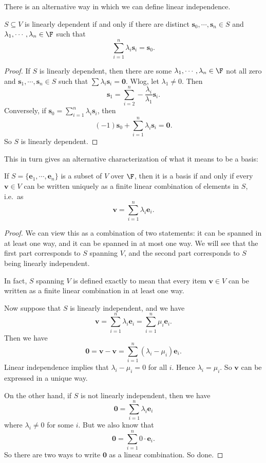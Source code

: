 \documentclass[a4paper]{article}
\begin{document}
There is an alternative way in which we can define linear independence.
\begin{lemma}
  $S\subseteq V$ is linearly dependent if and only if there are distinct $\mathbf{s}_0, \cdots, \mathbf{s}_n \in S$ and $\lambda_1, \cdots, \lambda_n\in \F$ such that
  \[
    \sum_{i = 1}^n \lambda_i \mathbf{s}_i = \mathbf{s}_0.
  \]
\end{lemma}

\begin{proof}
  If $S$ is linearly dependent, then there are some $\lambda_1, \cdots, \lambda_n \in \F$ not all zero and $\mathbf{s}_1,\cdots, \mathbf{s}_n \in S$ such that $\sum \lambda_i \mathbf{s}_i = \mathbf{0}$. Wlog, let $\lambda_1\not= 0$. Then
  \[
    \mathbf{s}_1 = \sum_{i = 2}^n -\frac{\lambda_i}{\lambda_1} \mathbf{s}_i.
  \]
  Conversely, if $\mathbf{s}_0 = \sum_{i = 1}^n \lambda_i \mathbf{s}_i$, then
  \[
    (-1)\mathbf{s}_0 + \sum_{i = 1}^n \lambda_i \mathbf{s}_i = \mathbf{0}.
  \]
  So $S$ is linearly dependent.
\end{proof}

This in turn gives an alternative characterization of what it means to be a basis:
\begin{prop}
  If $S = \{\mathbf{e}_1, \cdots, \mathbf{e}_n\}$ is a subset of $V$ over $\F$, then it is a basis if and only if every $\mathbf{v}\in V$ can be written uniquely as a finite linear combination of elements in $S$, i.e.\ as
  \[
    \mathbf{v} = \sum_{i = 1}^n \lambda_i \mathbf{e}_i.
  \]
\end{prop}

\begin{proof}
  We can view this as a combination of two statements: it can be spanned in at least one way, and it can be spanned in at most one way. We will see that the first part corresponds to $S$ spanning $V$, and the second part corresponds to $S$ being linearly independent.

  In fact, $S$ spanning $V$ is defined exactly to mean that every item $\mathbf{v}\in V$ can be written as a finite linear combination in at least one way.

  Now suppose that $S$ is linearly independent, and we have
  \[
    \mathbf{v} = \sum_{i = 1}^n \lambda_i \mathbf{e}_i = \sum_{i = 1}^n\mu_i \mathbf{e}_i.
  \]
  Then we have
  \[
    \mathbf{0} = \mathbf{v} - \mathbf{v} = \sum_{i = 1}^n (\lambda_i - \mu_i) \mathbf{e}_i.
  \]
  Linear independence implies that $\lambda_i - \mu_i = 0$ for all $i$. Hence $\lambda_i = \mu_i$. So $\mathbf{v}$ can be expressed in a unique way.

  On the other hand, if $S$ is not linearly independent, then we have
  \[
    \mathbf{0} = \sum_{i = 1}^n \lambda_i \mathbf{e}_i
  \]
  where $\lambda_i \not= 0$ for some $i$. But we also know that
  \[
    \mathbf{0} = \sum_{i = 1}^n 0\cdot \mathbf{e}_i.
  \]
  So there are two ways to write $\mathbf{0}$ as a linear combination. So done.
\end{proof}
\end{document}
